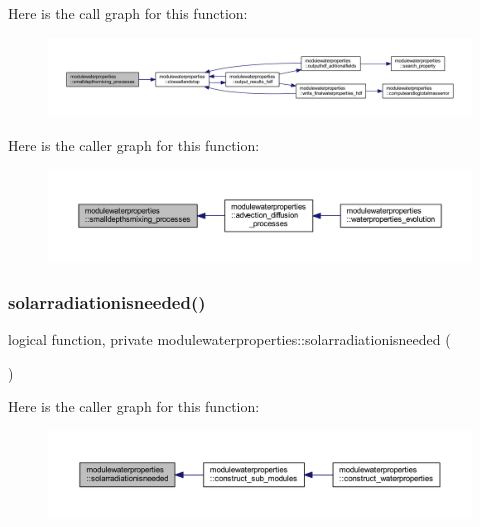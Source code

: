 Here is the call graph for this function\+:\nopagebreak
\begin{figure}[H]
\begin{center}
\leavevmode
\includegraphics[width=350pt]{namespacemodulewaterproperties_ad38f0837c272b87901bd3963788eb9e9_cgraph}
\end{center}
\end{figure}
Here is the caller graph for this function\+:\nopagebreak
\begin{figure}[H]
\begin{center}
\leavevmode
\includegraphics[width=350pt]{namespacemodulewaterproperties_ad38f0837c272b87901bd3963788eb9e9_icgraph}
\end{center}
\end{figure}
\mbox{\label{namespacemodulewaterproperties_a53711f4b1de0dd2fa6207fc580193db9}} 
\subsubsection{\texorpdfstring{solarradiationisneeded()}{solarradiationisneeded()}}
{\footnotesize\ttfamily logical function, private modulewaterproperties\+::solarradiationisneeded (\begin{DoxyParamCaption}{ }\end{DoxyParamCaption})\hspace{0.3cm}{\ttfamily [private]}}

Here is the caller graph for this function\+:\nopagebreak
\begin{figure}[H]
\begin{center}
\leavevmode
\includegraphics[width=350pt]{namespacemodulewaterproperties_a53711f4b1de0dd2fa6207fc580193db9_icgraph}
\end{center}
\end{figure}
\mbox{\label{namespacemodulewaterproperties_ab589508866130f683e9d48bc7aeb235c}} 
